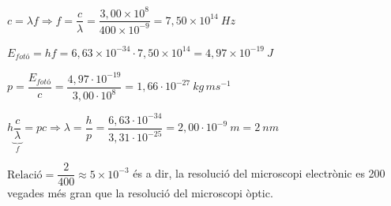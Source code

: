 \begin{solapartat}
 $c = \lambda f \Rightarrow f = \dfrac{c}{\lambda} = \dfrac{3,00\times 10^{8}}{400\times 10^{-9}} = 7,50\times 10^{14}\ Hz$

 $E_{\textit{fotó}} = hf = 6,63\times 10^{-34}\cdot 7,50\times 10^{14} = 4,97\times 10^{-19}\ J$\quad {}

 $p = \dfrac{E_{\textit{fotó}}}{c} = \dfrac{4,97\cdot 10^{-19}}{3,00\cdot 10^{8}} = 1,66\cdot 10^{-27}\ kg\,ms^{-1}$\quad {}
\end{solapartat}

\begin{solapartat}
 $h\underbrace{\dfrac{c}{\lambda}}_{f} = pc \Rightarrow \lambda = \dfrac{h}{p} = \dfrac{6,63\cdot 10^{-34}}{3,31\cdot 10^{-25}} = 2,00\cdot 10^{-9}\ m = 2\ nm$\quad {}

 $\text{Relació} = \dfrac{2}{400} \approx 5\times 10^{-3}$ és a dir, la resolució del microscopi electrònic es 200 vegades més gran que la resolució del microscopi òptic.
\end{solapartat}
